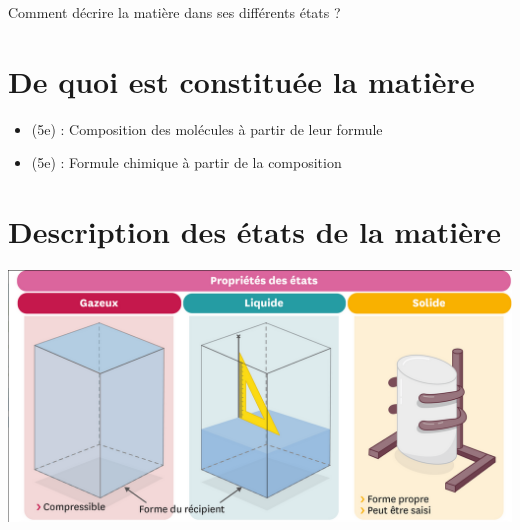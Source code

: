 \documentclass[12pt,a4paper]{article}
\date{}
\title{}
\begin{document}
	
\graphicspath{{./img/}}	



\begin{mypb}
	\begin{center}
		{\Large Comment décrire la matière dans ses différents états ?}
	\end{center}
\end{mypb}


\section{De quoi est constituée la matière}








\begin{myexos}
	\begin{itemize}
		\item {} (5e) : Composition des molécules à partir de leur formule
		\item {} (5e) : Formule chimique à partir de la composition
	\end{itemize}
\end{myexos}

\section{Description des états de la matière}





\begin{center}
	\includegraphics[scale=0.5]{etats}
\end{center}
\end{document}
